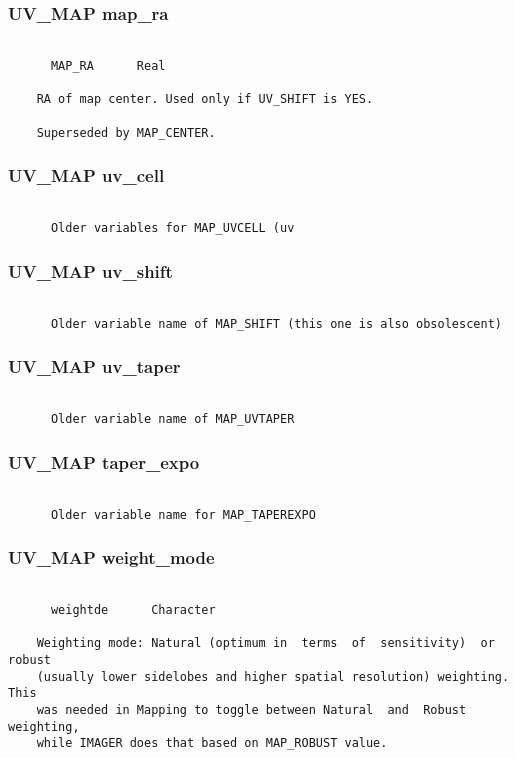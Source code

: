 \subsubsection{UV\_MAP map\_ra}
\begin{verbatim}

      MAP_RA      Real

    RA of map center. Used only if UV_SHIFT is YES.

    Superseded by MAP_CENTER.

\end{verbatim}
\subsubsection{UV\_MAP uv\_cell}
\begin{verbatim}

      Older variables for MAP_UVCELL (uv
\end{verbatim}
\subsubsection{UV\_MAP uv\_shift}
\begin{verbatim}

      Older variable name of MAP_SHIFT (this one is also obsolescent)

\end{verbatim}
\subsubsection{UV\_MAP uv\_taper}
\begin{verbatim}

      Older variable name of MAP_UVTAPER

\end{verbatim}
\subsubsection{UV\_MAP taper\_expo}
\begin{verbatim}

      Older variable name for MAP_TAPEREXPO

\end{verbatim}
\subsubsection{UV\_MAP weight\_mode}
\begin{verbatim}

      weightde      Character

    Weighting mode: Natural (optimum in  terms  of  sensitivity)  or  robust
    (usually lower sidelobes and higher spatial resolution) weighting.  This
    was needed in Mapping to toggle between Natural  and  Robust  weighting,
    while IMAGER does that based on MAP_ROBUST value.







\end{verbatim}
